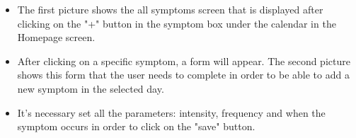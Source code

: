 \documentclass [12pt]{article}
\begin{document}
\begin{description}[leftmargin=1cm,rightmargin=1cm]
\begin{figure}[h!]
\hspace*{\fill}
\end{figure}
\begin{itemize}[•]
\item The first picture shows the all symptoms screen that is displayed after clicking on the "+" button in the symptom box under the calendar in the Homepage screen. 
\item After clicking on a specific symptom, a form will appear. The second picture shows this form that the user needs to complete in order to be able to add a new symptom in the selected day. 
\item It's necessary set all the parameters: intensity, frequency and when the symptom occurs in order to click on the "save" button.
\end{itemize}
\clearpage
\item [ 3)Add Dish page]
\
\
\
\begin{figure}[h!]
\centering
\hspace*{\fill}
\begin{subfigure}[tl]{0.3\linewidth}

\end{subfigure}
\end{figure}
\end{description}
\end{document}
